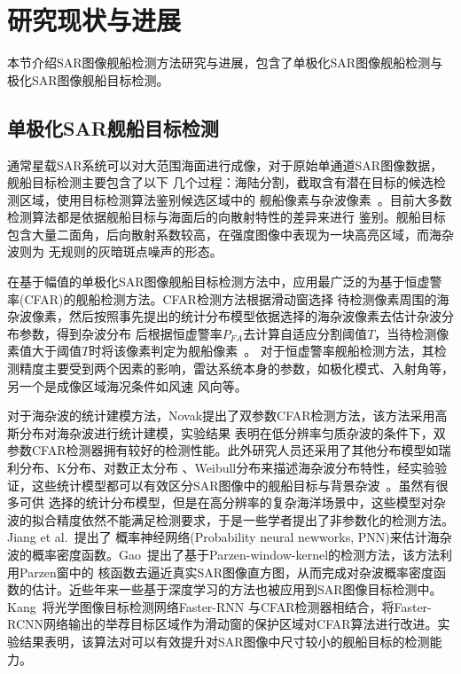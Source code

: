 \section{研究现状与进展}
  本节介绍SAR图像舰船检测方法研究与进展，包含了单极化SAR图像舰船检测与极化SAR图像舰船目标检测。
\subsection{单极化SAR舰船目标检测}
    通常星载SAR系统可以对大范围海面进行成像，对于原始单通道SAR图像数据，舰船目标检测主要包含了以下
    几个过程：海陆分割，截取含有潜在目标的候选检测区域，使用目标检测算法鉴别候选区域中的
    舰船像素与杂波像素~\cite{article}。目前大多数检测算法都是依据舰船目标与海面后的向散射特性的差异来进行
    鉴别。舰船目标包含大量二面角，后向散射系数较高，在强度图像中表现为一块高亮区域，而海杂波则为
    无规则的灰暗斑点噪声的形态。

    在基于幅值的单极化SAR图像舰船目标检测方法中，应用最广泛的为基于恒虚警率(CFAR)的舰船检测方法。CFAR检测方法根据滑动窗选择
    待检测像素周围的海杂波像素，然后按照事先提出的统计分布模型依据选择的海杂波像素去估计杂波分布参数，得到杂波分布
    后根据恒虚警率$P_{FA}$去计算自适应分割阈值$T$，当待检测像素值大于阈值$T$时将该像素判定为舰船像素~\cite{王兆成2017基于单极化}。
    对于恒虚警率舰船检测方法，其检测精度主要受到两个因素的影响，雷达系统本身的参数，如极化模式、入射角等，另一个是成像区域海况条件如风速
    风向等。

    对于海杂波的统计建模方法，Novak\cite{Novak}提出了双参数CFAR检测方法，该方法采用高斯分布对海杂波进行统计建模，实验结果
    表明在低分辨率匀质杂波的条件下，双参数CFAR检测器拥有较好的检测性能。此外研究人员还采用了其他分布模型如瑞利分布、K分布、对数正太分布
    、Weibull分布来描述海杂波分布特性，经实验验证，这些统计模型都可以有效区分SAR图像中的舰船目标与背景杂波~\cite{Carretero2010Statistical}。虽然有很多可供
    选择的统计分布模型，但是在高分辨率的复杂海洋场景中，这些模型对杂波的拟合精度依然不能满足检测要求，于是一些学者提出了非参数化的检测方法。Jiang et al.~\cite{Q2000Automatic}提出了
    概率神经网络(Probability neural newworks, PNN)来估计海杂波的概率密度函数。Gao~\cite{Gao2011A}提出了基于Parzen-window-kernel的检测方法，该方法利用Parzen窗中的
    核函数去逼近真实SAR图像直方图，从而完成对杂波概率密度函数的估计。近些年来一些基于深度学习的方法也被应用到SAR图像目标检测中。Kang~\cite{Miao2017A}将光学图像目标检测网络Faster-RNN
    与CFAR检测器相结合，将Faster-RCNN网络输出的举荐目标区域作为滑动窗的保护区域对CFAR算法进行改进。实验结果表明，该算法对可以有效提升对SAR图像中尺寸较小的舰船目标的检测能力。

